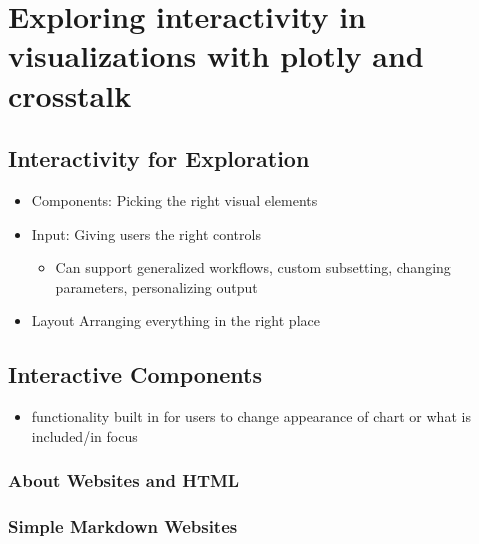 \documentclass[
]{krantz}
\providecommand{\tightlist}{%
  \setlength{\itemsep}{0pt}\setlength{\parskip}{0pt}}
\begin{document}
\hypertarget{interactive-visualizations}{%
\chapter{Exploring interactivity in visualizations with plotly and crosstalk}\label{interactive-visualizations}}

\hypertarget{interactivity-for-exploration}{%
\section{Interactivity for Exploration}\label{interactivity-for-exploration}}

\begin{itemize}
\tightlist
\item
  Components: Picking the right visual elements
\item
  Input: Giving users the right controls

  \begin{itemize}
  \tightlist
  \item
    Can support generalized workflows, custom subsetting, changing parameters, personalizing output
  \end{itemize}
\item
  Layout Arranging everything in the right place
\end{itemize}

\hypertarget{interactive-components}{%
\section{Interactive Components}\label{interactive-components}}

\begin{itemize}
\tightlist
\item
  functionality built in for users to change appearance of chart or what is included/in focus
\end{itemize}

\hypertarget{about-websites-and-html}{%
\subsection{About Websites and HTML}\label{about-websites-and-html}}

\hypertarget{simple-markdown-websites}{%
\subsection{Simple Markdown Websites}\label{simple-markdown-websites}}
\end{document}
